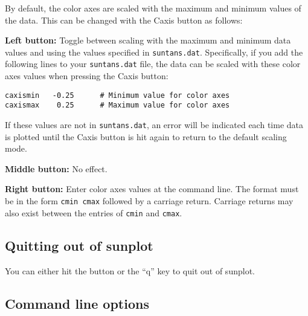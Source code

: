\documentclass[12pt,oneside]{article}
\begin{document}
By default, the color axes are scaled with the maximum and minimum values of the data.
This can be changed with the Caxis button as follows:
\begin{list}{}
\item {}
\begin{list}{}
\item {\bf Left button:} Toggle between scaling with the maximum and minimum data values and
using the values specified in \verb+suntans.dat+.  Specifically, if you add the following
lines to your \verb+suntans.dat+ file, the data can be scaled with these color axes values
when pressing the Caxis button:
\begin{verbatim}
caxismin   -0.25      # Minimum value for color axes
caxismax    0.25      # Maximum value for color axes
\end{verbatim}
If these values are not in \verb+suntans.dat+, an error will be indicated each time data
is plotted until the Caxis button is hit again to return to the default scaling mode.
\item {\bf Middle button:} No effect.
\item {\bf Right button:}  Enter color axes values at the command line.  The format must be
in the form \verb+cmin cmax+ followed by a carriage return.  Carriage returns may also
exist between the entries of \verb+cmin+ and \verb+cmax+.
\end{list}
\end{list}

\subsection{Quitting out of sunplot}

You can either hit the  button or the ``q'' key to quit out of sunplot.

\subsection{Command line options}
\end{document}
